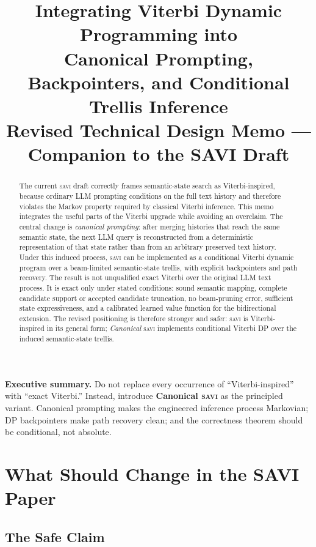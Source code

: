 \documentclass[11pt,letterpaper]{article}
\title{\textbf{Integrating Viterbi Dynamic Programming into \SAVI}\\
       \large Canonical Prompting, Backpointers, and Conditional Trellis Inference\\[6pt]
       \normalsize Revised Technical Design Memo --- Companion to the SAVI Draft}
\author{}
\date{}
\newcommand{\SAVI}{\textsc{savi}\xspace}
\begin{document}
\maketitle
\thispagestyle{fancy}

\begin{abstract}
The current \SAVI draft correctly frames semantic-state search as Viterbi-inspired, because ordinary
LLM prompting conditions on the full text history and therefore violates the Markov property required
by classical Viterbi inference.
This memo integrates the useful parts of the Viterbi upgrade while avoiding an overclaim.
The central change is \emph{canonical prompting}: after merging histories that reach the same semantic
state, the next LLM query is reconstructed from a deterministic representation of that state rather than
from an arbitrary preserved text history.
Under this induced process, \SAVI can be implemented as a conditional Viterbi dynamic program over
a beam-limited semantic-state trellis, with explicit backpointers and path recovery.
The result is not unqualified exact Viterbi over the original LLM text process.
It is exact only under stated conditions: sound semantic mapping, complete candidate support or
accepted candidate truncation, no beam-pruning error, sufficient state expressiveness, and a calibrated
learned value function for the bidirectional extension.
The revised positioning is therefore stronger and safer:
\SAVI is Viterbi-inspired in its general form;
\emph{Canonical} \SAVI implements conditional Viterbi DP over the induced semantic-state trellis.
\end{abstract}

\begin{callout}
\textbf{Executive summary.}
Do not replace every occurrence of ``Viterbi-inspired'' with ``exact Viterbi.''
Instead, introduce \textbf{Canonical \SAVI} as the principled variant.
Canonical prompting makes the engineered inference process Markovian;
DP backpointers make path recovery clean;
and the correctness theorem should be conditional, not absolute.
\end{callout}

\tableofcontents
\newpage

\section{What Should Change in the SAVI Paper}

\subsection{The Safe Claim}
\end{document}
